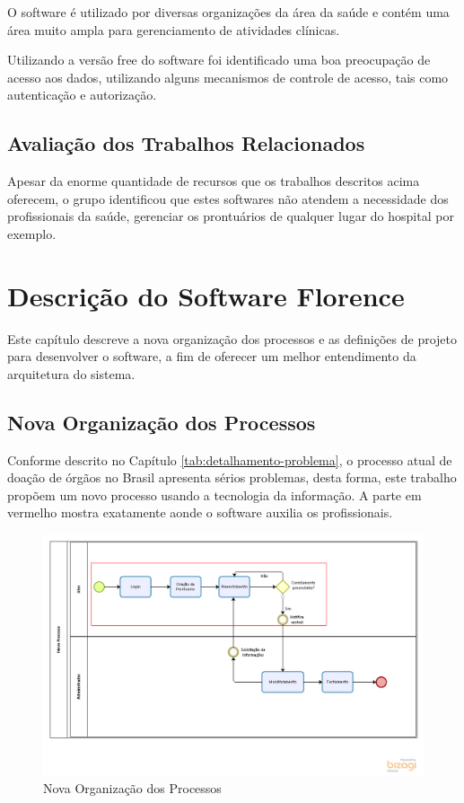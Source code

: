 \documentclass[portuguese,oneside]{tcc}
\begin{document}
O software é utilizado por diversas organizações da área da saúde e contém uma área muito ampla para gerenciamento de atividades clínicas.

Utilizando a versão free do software foi identificado uma boa preocupação de acesso aos dados, utilizando alguns mecanismos de controle de acesso, tais como autenticação e autorização.

\section{Avaliação dos Trabalhos Relacionados}
Apesar da enorme quantidade de recursos que os trabalhos descritos acima oferecem, o grupo identificou que estes softwares não atendem a necessidade dos profissionais da saúde, gerenciar os prontuários de qualquer lugar do hospital por exemplo.


\chapter{Descrição do Software Florence} \label{tab:descricao-trabalho}
Este capítulo descreve a nova organização dos processos e as definições de projeto para desenvolver o software, a fim de oferecer um melhor entendimento da arquitetura do sistema.


\section{Nova Organização dos Processos}
Conforme descrito no Capítulo \ref{tab:detalhamento-problema}, o processo atual de doação de órgãos no Brasil apresenta sérios problemas, desta forma, este trabalho propõem um novo processo usando a tecnologia da informação. A parte em vermelho mostra exatamente aonde o software auxilia os profissionais.


\begin{figure}[htp]
\centering
\caption{Nova Organização dos Processos}
\includegraphics[width=16cm]{modelagem-novo-processo}

\label{fig:novo-processo}
\end{figure}
\end{document}

